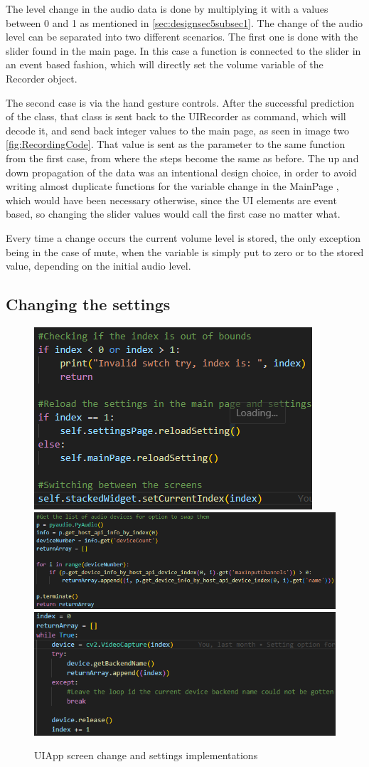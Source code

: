 \par The level change in the audio data is done by multiplying it with a values between 0 and 1 as mentioned in \ref{sec:designsec5subsec1}. The change of the audio level can be separated into two different scenarios. The first one is done with the slider found in the main page. In this case a function is connected to the slider in an event based fashion, which will directly set the volume variable of the Recorder object.
\par The second case is via the hand gesture controls. After the successful prediction of the class, that class is sent back to the UIRecorder as command, which will decode it, and send back integer values to the main page, as seen in image two \ref{fig:RecordingCode}. That value is sent as the parameter to the same function from the first case, from where the steps become the same as before. The up and down propagation of the data was an intentional design choice, in order to avoid writing almost duplicate functions for the variable change in the MainPage , which would have been necessary otherwise, since the UI elements are event based, so changing the slider values would call the first case no matter what.
\par Every time a change occurs the current volume level is stored, the only exception being in the case of mute, when the variable is simply put to zero or to the stored value, depending on the initial audio level.

\subsection{Changing the settings}
\label{sec:designsec5subsec4}

\begin{figure}
    \centering
    \includegraphics[width=0.4\linewidth]{figures/ScreenChange.png}
    \includegraphics[width=0.4\linewidth]{figures/MicrophoneList.png}
    \includegraphics[width=0.4\linewidth]{figures/CameraList.png}
    \caption{UIApp screen change and settings implementations}
    \label{fig:ScreenChange}
\end{figure}

